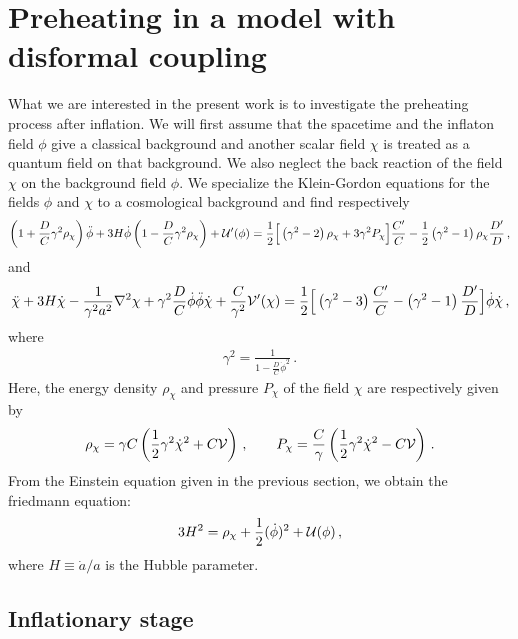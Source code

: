 \documentclass[aps,prd,amsmath,amssymb,preprintnumbers,onecolumn,11pt,nofootinbib]{revtex4}
\begin{document}
\section{Preheating in a model with disformal coupling}
\label{sec3}
What we are interested in the present work is to investigate the preheating process after inflation. We will first assume that the spacetime and the inflaton field $\phi$ give a classical background and another scalar field $\chi$ is treated as a quantum field on that background. We also neglect the back reaction of the field $\chi$ on the background field $\phi$. We specialize the Klein-Gordon equations for the fields $\phi$ and $\chi$ to a cosmological background and find respectively
\begin{eqnarray} \label{KGphi}
\left(1+\frac{D}{C}\gamma^{2}\rho_{\chi}\right)\ddot{\phi} +3H\dot{\phi} \left(1-\frac{D}{C}\gamma^{2}\rho_{\chi}\right) +{\cal U}'(\phi) =  \frac{1}{2}\Big[\left(\gamma^{2} - 2\right)\rho_{\chi} +3\gamma^{2}P_{\chi}\Big] \frac{C'}{C} - \frac{1}{2}\left(\gamma^{2} - 1\right)\rho_{\chi}\frac{D'}{D}\,, 
\end{eqnarray}
and
\begin{eqnarray} \label{KGchi}
\ddot{\chi} +3H\dot{\chi} -\frac{1}{\gamma^{2}a^{2}}\nabla^{2}\chi+ \gamma^{2}\frac{D}{C}\dot{\phi}\ddot{\phi}\dot{\chi}+\frac{C}{\gamma^{2}}{\cal V}'(\chi) =  \frac{1}{2}\Big[\left(\gamma^{2} - 3\right)\frac{C'}{C} -\left(\gamma^{2} - 1\right)\frac{D'}{D}\Big]\dot{\phi}\dot{\chi} \,,
\end{eqnarray}
where 
\begin{eqnarray} \label{gamma}
\gamma^{2} = \frac{1}{1-\frac{D}{C}\dot{\phi}^{2}}\,.
\end{eqnarray}
Here, the energy density $\rho_\chi$ and pressure $P_{\chi}$ of the field $\chi$ are respectively given by
\begin{equation}\label{rpchi}
\rho_\chi = \gamma C\left( \frac{1}{2}\gamma^2\dot{\chi}^2+C {\cal V}\right) \,,
\qquad
P_{\chi} = \frac{C}{\gamma} \left( \frac{1}{2}\gamma^2\dot{\chi}^2 - C {\cal V}\right)\,.
 \end{equation}
From the Einstein equation given in the previous section,
we obtain the friedmann equation:
\begin{equation}\label{h2}
3 H^2 = \rho_\chi + \frac 12 (\dot\phi)^2 + {\cal U}(\phi)\,,
\end{equation}
where $H \equiv \dot a / a$ is the Hubble parameter.

\subsection{Inflationary stage}
\label{evo-inf}
\end{document}
